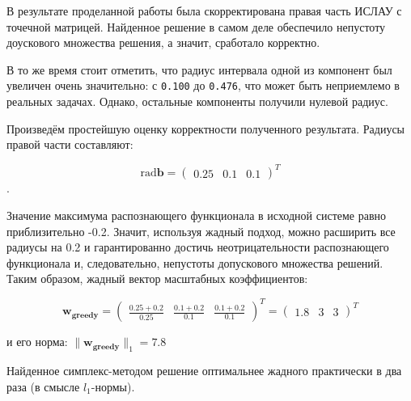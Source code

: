 В результате проделанной работы была скорректирована правая часть ИСЛАУ с точечной матрицей. Найденное решение в самом деле обеспечило непустоту доускового множества решения, а значит, сработало корректно.

В то же время стоит отметить, что радиус интервала одной из компонент был увеличен очень значительно: с \texttt{0.100} до \texttt{0.476}, что может быть неприемлемо в реальных задачах. Однако, остальные компоненты получили нулевой радиус.

Произведём простейшую оценку корректности полученного результата.
Радиусы правой части составляют:

\begin{equation}
\textrm{rad} \mathbf{b}=
\begin{pmatrix}
0.25 & 0.1 & 0.1
\end{pmatrix}^T
\end{equation}.

Значение максимума распознающего функционала в исходной системе равно приблизительно -0.2. Значит, используя жадный подход, можно расширить все радиусы на 0.2 и гарантированно достичь неотрицательности распознающего функционала и, следовательно, непустоты допускового множества решений. Таким образом, жадный вектор масштабных коэффициентов:

\begin{equation}
\mathbf{w_{greedy}}=
\begin{pmatrix}
\frac{0.25 + 0.2}{0.25} & \frac{0.1 + 0.2}{0.1} & \frac{0.1 + 0.2}{0.1}
\end{pmatrix}^T
=
\begin{pmatrix}
1.8 & 3 & 3
\end{pmatrix}^T
\end{equation}

и его норма: $\|\mathbf{w_{greedy}}\|_1=7.8$

Найденное симплекс-методом решение оптимальнее жадного практически в два раза (в смысле $l_1$-нормы).